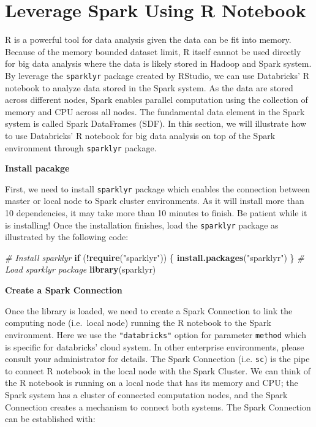 \documentclass[12pt,]{krantz}
\makeatletter
\newenvironment{Shaded}{\begin{snugshade}}{\end{snugshade}}
\newcommand{\CommentTok}[1]{\textcolor[rgb]{0.37,0.37,0.37}{\textit{#1}}}
\newcommand{\ControlFlowTok}[1]{\textcolor[rgb]{0.27,0.27,0.27}{\textbf{#1}}}
\newcommand{\KeywordTok}[1]{\textcolor[rgb]{0.27,0.27,0.27}{\textbf{#1}}}
\newcommand{\NormalTok}[1]{#1}
\newcommand{\OperatorTok}[1]{\textcolor[rgb]{0.43,0.43,0.43}{\textbf{#1}}}
\newcommand{\StringTok}[1]{\textcolor[rgb]{0.5,0.5,0.5}{#1}}
\newenvironment{kframe}{%
\medskip{}
\setlength{\fboxsep}{.8em}
 \def\at@end@of@kframe{}%
 \ifinner\ifhmode%
  \def\at@end@of@kframe{\end{minipage}}%
  \begin{minipage}{\columnwidth}%
 \fi\fi%
 \def\FrameCommand##1{\hskip\@totalleftmargin \hskip-\fboxsep
 \colorbox{shadecolor}{##1}\hskip-\fboxsep
     \hskip-\linewidth \hskip-\@totalleftmargin \hskip\columnwidth}%
 \MakeFramed {\advance\hsize-\width
   \@totalleftmargin\z@ \linewidth\hsize
   \@setminipage}}%
 {\par\unskip\endMakeFramed%
 \at@end@of@kframe}
\renewenvironment{Shaded}{\begin{kframe}}{\end{kframe}}
\makeatother
\begin{document}
\hypertarget{leveragesparkr}{%
\section{Leverage Spark Using R Notebook}\label{leveragesparkr}}

R is a powerful tool for data analysis given the data can be fit into memory. Because of the memory bounded dataset limit, R itself cannot be used directly for big data analysis where the data is likely stored in Hadoop and Spark system. By leverage the \texttt{sparklyr} package created by RStudio, we can use Databricks' R notebook to analyze data stored in the Spark system. As the data are stored across different nodes, Spark enables parallel computation using the collection of memory and CPU across all nodes. The fundamental data element in the Spark system is called Spark DataFrames (SDF). In this section, we will illustrate how to use Databricks' R notebook for big data analysis on top of the Spark environment through \texttt{sparklyr} package.

\textbf{Install pacakge}

First, we need to install \texttt{sparklyr} package which enables the connection between master or local node to Spark cluster environments. As it will install more than 10 dependencies, it may take more than 10 minutes to finish. Be patient while it is installing! Once the installation finishes, load the \texttt{sparklyr} package as illustrated by the following code:

\begin{Shaded}
\begin{Highlighting}[]
\CommentTok{# Install sparklyr}
\ControlFlowTok{if}\NormalTok{ (}\OperatorTok{!}\KeywordTok{require}\NormalTok{(}\StringTok{"sparklyr"}\NormalTok{)) \{}
\KeywordTok{install.packages}\NormalTok{(}\StringTok{"sparklyr"}\NormalTok{)}
\NormalTok{\}}
\CommentTok{# Load sparklyr package}
\KeywordTok{library}\NormalTok{(sparklyr)}
\end{Highlighting}
\end{Shaded}

\textbf{Create a Spark Connection}

Once the library is loaded, we need to create a Spark Connection to link the computing node (i.e.~local node) running the R notebook to the Spark environment. Here we use the \texttt{"databricks"} option for parameter \texttt{method} which is specific for databricks' cloud system. In other enterprise environments, please consult your administrator for details. The Spark Connection (i.e. \texttt{sc}) is the pipe to connect R notebook in the local node with the Spark Cluster. We can think of the R notebook is running on a local node that has its memory and CPU; the Spark system has a cluster of connected computation nodes, and the Spark Connection creates a mechanism to connect both systems. The Spark Connection can be established with:
\end{document}
